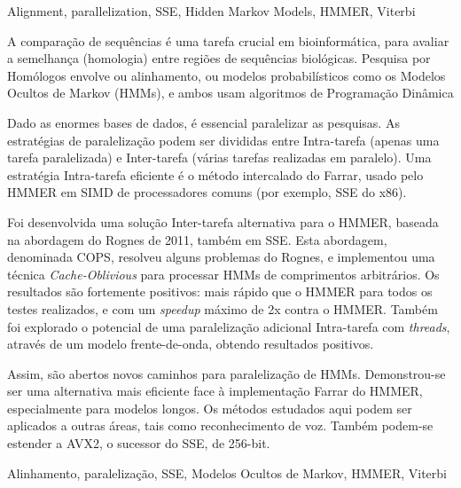 \documentclass[defaultstyle,10pt,master,Helvetica]{thesis}
\begin{document}
\begin{keywords}
Alignment, parallelization, SSE, Hidden Markov Models, HMMER, Viterbi
\end{keywords}
\clearpage


\thispagestyle{empty}
\clearpage

\begin{resumo}
A comparação de sequências é uma tarefa crucial em bioinformática, para avaliar a semelhança (homologia) entre regiões de sequências biológicas. Pesquisa por Homólogos envolve ou alinhamento, ou modelos probabilísticos como os Modelos Ocultos de Markov (HMMs), e ambos usam algoritmos de Programação Dinâmica

Dado as enormes bases de dados, é essencial paralelizar as pesquisas. As estratégias de paralelização podem ser divididas entre Intra-tarefa (apenas uma tarefa paralelizada) e Inter-tarefa (várias tarefas realizadas em paralelo). Uma estratégia Intra-tarefa eficiente é o método intercalado do Farrar, usado pelo HMMER em SIMD de processadores comuns (por exemplo, SSE do x86).

Foi desenvolvida uma solução Inter-tarefa alternativa para o HMMER, baseada na abordagem do Rognes de 2011, também em SSE. Esta abordagem, denominada COPS, resolveu alguns problemas do Rognes, e implementou uma técnica \emph{Cache-Oblivious} para processar HMMs de comprimentos arbitrários. Os resultados são fortemente positivos: mais rápido que o HMMER para todos os testes realizados, e com um \emph{speedup} máximo de 2x contra o HMMER. Também foi explorado o potencial de uma paralelização adicional Intra-tarefa com \emph{threads}, através de um modelo frente-de-onda, obtendo resultados positivos.

Assim, são abertos novos caminhos para paralelização de HMMs. Demonstrou-se ser uma alternativa mais eficiente face à implementação Farrar do HMMER, especialmente para modelos longos. Os métodos estudados aqui podem ser aplicados a outras áreas, tais como reconhecimento de voz. Também podem-se estender a AVX2, o sucessor do SSE, de 256-bit.

\end{resumo}
\clearpage

\begin{palavraschave}
Alinhamento, paralelização, SSE, Modelos Ocultos de Markov, HMMER, Viterbi
\end{palavraschave}

\clearpage
\thispagestyle{empty}
\cleardoublepage
\end{document}
